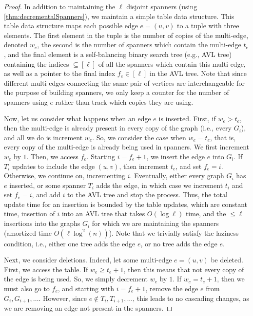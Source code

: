 \documentclass{article}
\begin{document}
\begin{proof}
    In addition to maintaining the $\ell$ disjoint spanners (using \cref{thm:decrementalSpanners}), we maintain a simple table data structure. This table data structure maps each possible edge $e = (u,v)$ to a tuple with three elements. The first element in the tuple is the number of copies of the multi-edge, denoted  $w_e$, the second is the number of spanners which contain the multi-edge $t_e$, and the final element is a self-balancing binary search tree (e.g., AVL tree) containing the indices $\subseteq [\ell]$ of all the spanners which contain this multi-edge, as well as a pointer to the final index $f_e \in [\ell]$ in the AVL tree.
Note that since different multi-edges connecting the same pair of vertices are
    interchangeable for the purpose of building spanners,
    we only keep a counter for the number of spanners using $e$ rather than
    track which copies they are using.
    

    Now, let us consider what happens when an edge $e$ is inserted. First, if $w_e > t_e$, then the multi-edge is already present in every copy of the graph (i.e., every $G_i$), and all we do is increment $w_e$. So, we consider the case when $w_e = t_e$, that is, every copy of the multi-edge is already being used in spanners. We first increment $w_e$ by $1$. Then, we access $f_e$. Starting $i = f_e + 1$, we insert the edge $e$ into $G_i$. If $T_{i}$ updates to include the edge $(u,v)$, then increment $t_e$, and set $f_e = i$. Otherwise, we continue on, incrementing $i$. Eventually, either every graph $G_i$ has $e$ inserted, or some spanner $T_i$ adds the edge, in which case we increment $t_i$ and set $f_e = i$, and add $i$ to the AVL tree and stop the process. Thus, the total update time for an insertion is bounded by the table updates, which are constant time,
    insertion of $i$ into an AVL tree that takes $O(\log \ell)$ time,
    and the $\leq \ell$ insertions into the graphs $G_i$ for which we are maintaining the spanners (amortized time $O(\ell \log^2(n))$). Note that we trivially satisfy the laziness condition, i.e., either one tree adds the edge $e$, or no tree adds the edge $e$. 

    Next, we consider deletions. Indeed, let some multi-edge $e = (u,v)$ be deleted. First, we access the table. If $w_e \geq t_e + 1$, then this means that not every copy of the edge is being used. So, we simply decrement $w_e$ by $1$. If $w_e = t_e + 1$, then we must also go to $f_e$, and starting with $i = f_e + 1$, remove the edge $e$ from $G_i, G_{i+1}, \dots$. However, since $e \notin T_i, T_{i+1}, \dots$, this leads to no cascading changes, as we are removing an edge not present in the spanners. 
    

\end{proof}
\end{document}
